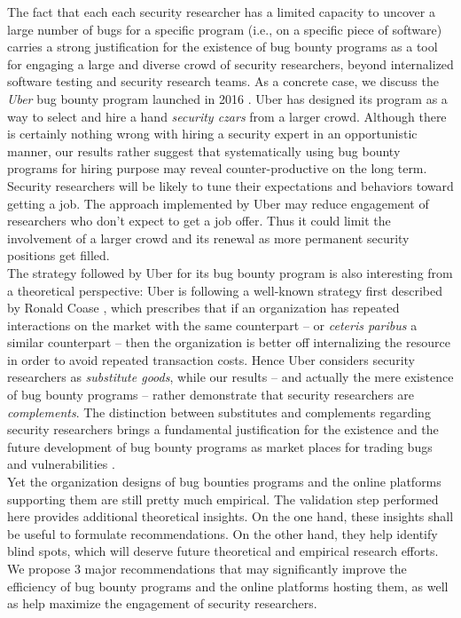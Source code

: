 The fact that each each security researcher has a limited capacity to uncover a large number of bugs for a specific program (i.e., on a specific piece of software) carries a strong justification for the existence of bug bounty programs as a tool for engaging a large and diverse crowd of security researchers, beyond internalized software testing and security research teams. As a concrete case, we discuss the {\it Uber} bug bounty program launched in 2016 \cite{moussouris2016}. Uber has designed its program as a way to select and hire a hand {\it security czars} from a larger crowd. Although there is certainly nothing wrong with hiring a security expert in an opportunistic manner, our results rather suggest that systematically using bug bounty programs for hiring purpose may reveal counter-productive on the long term. Security researchers will be likely to tune their expectations and behaviors toward getting a job. The approach implemented by Uber may reduce engagement of researchers who don't expect to get a job offer. Thus it could limit the involvement of a larger crowd and its renewal as more permanent security positions get filled. \\

The strategy followed by Uber for its bug bounty program is also interesting from a theoretical perspective: Uber is following a well-known strategy first described by Ronald Coase \cite{coase1937}, which prescribes that if an organization has repeated interactions on the market with the same counterpart -- or {\it ceteris paribus} a similar counterpart -- then the organization is better off internalizing the resource in order to avoid repeated transaction costs. Hence Uber considers security researchers as {\it substitute goods}, while our results -- and actually the mere existence of bug bounty programs -- rather demonstrate that security researchers are {\it complements}. The distinction between substitutes and complements regarding security researchers brings a fundamental justification for the existence and the future development of bug bounty programs as market places for trading bugs and vulnerabilities \cite{bohme2006comparison}. \\

Yet the organization designs of bug bounties programs and the online platforms supporting them are still pretty much empirical. The validation step performed here provides additional theoretical insights. On the one hand, these insights shall be useful to formulate recommendations. On the other hand, they help identify blind spots, which will deserve future theoretical and empirical research efforts. We propose 3 major recommendations that may significantly improve the efficiency of bug bounty programs and the online platforms hosting them, as well as help maximize the engagement of security researchers. 

